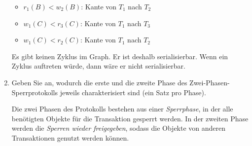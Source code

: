 \documentclass{lehramt-informatik-aufgabe}
\begin{document}
\begin{enumerate}
\begin{liAntwort}

\begin{itemize}
\item $r_1 (B) < w_2 (B)$: Kante von $T_1$ nach $T_2$
\item $w_1 (C) < r_3 (C)$: Kante von $T_1$ nach $T_3$
\item $w_1 (C) < r_2 (C)$: Kante von $T_1$ nach $T_2$
\end{itemize}


\begin{center}
\end{center}

Es gibt keinen Zyklus im Graph. Er ist deshalb serialisierbar. Wenn ein
Zyklus auftreten würde, dann wäre er nicht serialisierbar.
\end{liAntwort}


\item Geben Sie an, wodurch die erste und die zweite Phase des
Zwei-Phasen-Sperrprotokolls jeweils
charakterisiert sind (ein Satz pro Phase).

\begin{liAntwort}
Die zwei Phasen des Protokolls bestehen aus einer \emph{Sperrphase}, in der
alle benötigten Objekte für die Transaktion gesperrt werden. In der
zweiten Phase werden die \emph{Sperren wieder freigegeben}, sodass die
Objekte von anderen Transaktionen genutzt werden können.
\end{liAntwort}

\end{enumerate}
\end{document}
